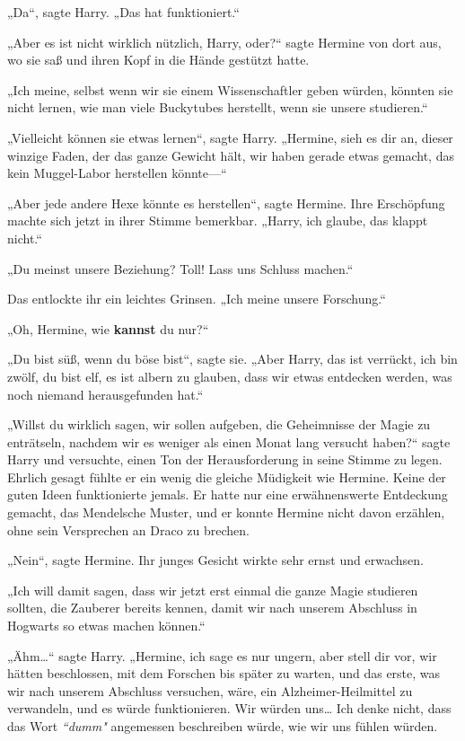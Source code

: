 {„Da“, sagte Harry. „Das hat funktioniert.“

„Aber es ist nicht wirklich nützlich, Harry, oder?“ sagte Hermine von dort aus, wo sie saß und ihren Kopf in die Hände gestützt hatte.

„Ich meine, selbst wenn wir sie einem Wissenschaftler geben würden, könnten sie nicht lernen, wie man viele Buckytubes herstellt, wenn sie unsere studieren.“

„Vielleicht können sie etwas lernen“, sagte Harry. „Hermine, sieh es dir an, dieser winzige Faden, der das ganze Gewicht hält, wir haben gerade etwas gemacht, das kein Muggel-Labor herstellen könnte—“

„Aber jede andere Hexe könnte es herstellen“, sagte Hermine. Ihre Erschöpfung machte sich jetzt in ihrer Stimme bemerkbar. „Harry, ich glaube, das klappt nicht.“

„Du meinst unsere Beziehung? Toll! Lass uns Schluss machen.“

Das entlockte ihr ein leichtes Grinsen. „Ich meine unsere Forschung.“

„Oh, Hermine, wie \textbf{kannst} du nur?“

„Du bist süß, wenn du böse bist“, sagte sie. „Aber Harry, das ist verrückt, ich bin zwölf, du bist elf, es ist albern zu glauben, dass wir etwas entdecken werden, was noch niemand herausgefunden hat.“

„Willst du wirklich sagen, wir sollen aufgeben, die Geheimnisse der Magie zu enträtseln, nachdem wir es weniger als einen Monat lang versucht haben?“ sagte Harry und versuchte, einen Ton der Herausforderung in seine Stimme zu legen. Ehrlich gesagt fühlte er ein wenig die gleiche Müdigkeit wie Hermine. Keine der guten Ideen funktionierte jemals. Er hatte nur eine erwähnenswerte Entdeckung gemacht, das Mendelsche Muster, und er konnte Hermine nicht davon erzählen, ohne sein Versprechen an Draco zu brechen.

„Nein“, sagte Hermine. Ihr junges Gesicht wirkte sehr ernst und erwachsen.

„Ich will damit sagen, dass wir jetzt erst einmal die ganze Magie studieren sollten, die Zauberer bereits kennen, damit wir nach unserem Abschluss in Hogwarts so etwas machen können.“

„Ähm…“ sagte Harry. „Hermine, ich sage es nur ungern, aber stell dir vor, wir hätten beschlossen, mit dem Forschen bis später zu warten, und das erste, was wir nach unserem Abschluss versuchen, wäre, ein Alzheimer-Heilmittel zu verwandeln, und es würde funktionieren. Wir würden uns… Ich denke nicht, dass das Wort \emph{“dumm"} angemessen beschreiben würde, wie wir uns fühlen würden.

}
